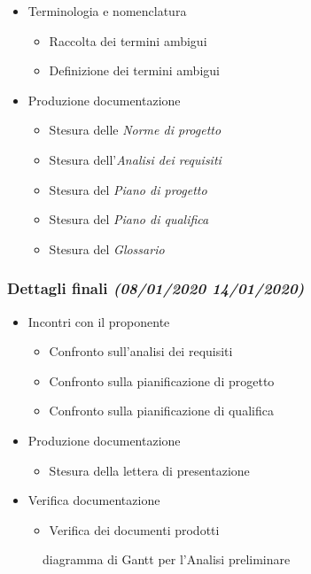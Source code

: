 \documentclass[../piano-di-progetto.tex]{subfiles}
\begin{document}
\begin{itemize}
\begin{itemize}
  \end{itemize}
  \item Terminologia e nomenclatura
  \begin{itemize}
    \item Raccolta dei termini ambigui
    \item Definizione dei termini ambigui
  \end{itemize}
  \item Produzione documentazione
  \begin{itemize}
    \item Stesura delle \textit{Norme di progetto}
    \item Stesura dell'\textit{Analisi dei requisiti}
    \item Stesura del \textit{Piano di progetto}
    \item Stesura del \textit{Piano di qualifica}
    \item Stesura del \textit{Glossario}
  \end{itemize}
\end{itemize}
\subsubsection[Dettagli finali]{Dettagli finali {\normalsize\normalfont\itshape(08/01/2020  14/01/2020)}}%
\label{subs:dettagli_finali}
\begin{itemize}
  \item Incontri con il proponente
  \begin{itemize}
    \item Confronto sull'analisi dei requisiti
    \item Confronto sulla pianificazione di progetto
    \item Confronto sulla pianificazione di qualifica
  \end{itemize}
  \item Produzione documentazione
  \begin{itemize}
    \item Stesura della lettera di presentazione
  \end{itemize}
  \item Verifica documentazione
  \begin{itemize}
    \item Verifica dei documenti prodotti
  \end{itemize}
\end{itemize}
\begin{figure}[H]
  \centering
  
  \caption{diagramma di Gantt per l'Analisi preliminare}
  \label{fig:gantt_analisi_preliminare}
\end{figure}
\end{document}
